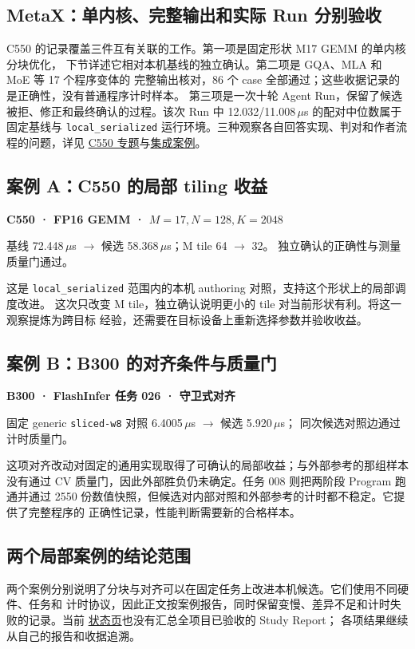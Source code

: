 \documentclass[UTF8,11pt,a4paper,fontset=none]{ctexart}
\newcommand{\code}[1]{\texttt{#1}}
\newcommand{\repo}[2]{\href{https://github.com/qhy991/open-cake-ir/blob/677eb444fec593294c470dcc5793262ae769fce2/#1}{#2}}
\begin{document}
\subsection{MetaX：单内核、完整输出和实际 Run 分别验收}
C550 的记录覆盖三件互有关联的工作。第一项是固定形状 M17 GEMM 的单内核分块优化，
下节详述它相对本机基线的独立确认。第二项是 GQA、MLA 和 MoE 等 17 个程序变体的
完整输出核对，86 个 case 全部通过；这些收据记录的是正确性，没有普通程序计时样本。
第三项是一次十轮 Agent Run，保留了候选被拒、修正和最终确认的过程。该次 Run 中
12.032/11.008\,$\mu$s 的配对中位数属于固定基线与 \code{local\_serialized}
运行环境。三种观察各自回答实现、判对和作者流程的问题，详见
\repo{docs/metax-c550.md}{C550 专题}与\repo{docs/ARCHITECTURE.md}{集成案例}。

\subsection{案例 A：C550 的局部 tiling 收益}
\begin{notebox}
\quad
\textbf{C550 · FP16 GEMM · $M=17,N=128,K=2048$}\par
\noindent\small 基线 72.448\,$\mu$s $\rightarrow$ 候选 58.368\,$\mu$s；M tile 64 $\rightarrow$ 32。
独立确认的正确性与测量质量门通过。
\end{notebox}
这是 \code{local\_serialized} 范围内的本机 authoring 对照，支持这个形状上的局部调度改进。
这次只改变 M tile，独立确认说明更小的 tile 对当前形状有利。将这一观察提炼为跨目标
经验，还需要在目标设备上重新选择参数并验收收益\cite{metax}。

\subsection{案例 B：B300 的对齐条件与质量门}
\begin{notebox}
\quad
\textbf{B300 · FlashInfer 任务 026 · 守卫式对齐}\par
\noindent\small 固定 generic \code{sliced-w8} 对照 6.4005\,$\mu$s $\rightarrow$ 候选 5.920\,$\mu$s；
同次候选对照边通过计时质量门。
\end{notebox}
这项对齐改动对固定的通用实现取得了可确认的局部收益；与外部参考的那组样本没有通过
CV 质量门，因此外部胜负仍未确定。任务 008 则把两阶段 Program 跑通并通过
2550 份数值快照，但候选对内部对照和外部参考的计时都不稳定。它提供了完整程序的
正确性记录，性能判断需要新的合格样本\cite{nvidia}。

\subsection{两个局部案例的结论范围}
两个案例分别说明了分块与对齐可以在固定任务上改进本机候选。它们使用不同硬件、任务和
计时协议，因此正文按案例报告，同时保留变慢、差异不足和计时失败的记录。当前
\repo{reports/current/STATUS.md}{状态页}也没有汇总全项目已验收的 Study Report；
各项结果继续从自己的报告和收据追溯。
\end{document}
